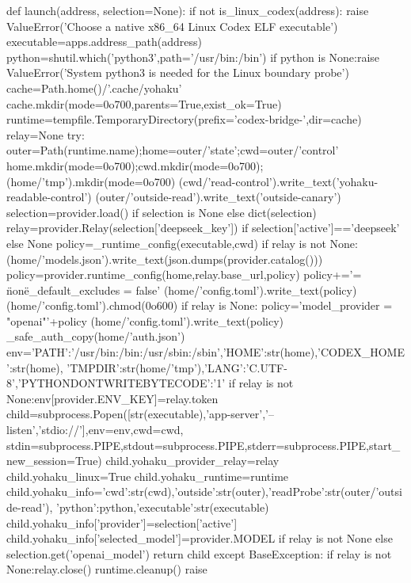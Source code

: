 def launch(address, selection=None):
    if not is_linux_codex(address):
        raise ValueError('Choose a native x86_64 Linux Codex ELF executable')
    executable=apps.address_path(address)
    python=shutil.which('python3',path='/usr/bin:/bin')
    if python is None:raise ValueError('System python3 is needed for the Linux boundary probe')
    cache=Path.home()/'.cache/yohaku'
    cache.mkdir(mode=0o700,parents=True,exist_ok=True)
    runtime=tempfile.TemporaryDirectory(prefix='codex-bridge-',dir=cache)
    relay=None
    try:
        outer=Path(runtime.name);home=outer/'state';cwd=outer/'control'
        home.mkdir(mode=0o700);cwd.mkdir(mode=0o700);(home/'tmp').mkdir(mode=0o700)
        (cwd/'read-control').write_text('yohaku-readable-control')
        (outer/'outside-read').write_text('outside-canary')
        selection=provider.load() if selection is None else dict(selection)
        relay=provider.Relay(selection['deepseek_key']) if selection['active']=='deepseek' else None
        policy=_runtime_config(executable,cwd)
        if relay is not None:
            (home/'models.json').write_text(json.dumps(provider.catalog()))
            policy=provider.runtime_config(home,relay.base_url,policy)
        policy+='\ninherit = \"none\"\nignore_default_excludes = false\n'
        (home/'config.toml').write_text(policy)
        (home/'config.toml').chmod(0o600)
        if relay is None:
            policy='model_provider = "openai"\n'+policy
            (home/'config.toml').write_text(policy)
            _safe_auth_copy(home/'auth.json')
        env={'PATH':'/usr/bin:/bin:/usr/sbin:/sbin','HOME':str(home),'CODEX_HOME':str(home),
             'TMPDIR':str(home/'tmp'),'LANG':'C.UTF-8','PYTHONDONTWRITEBYTECODE':'1'}
        if relay is not None:env[provider.ENV_KEY]=relay.token
        child=subprocess.Popen([str(executable),'app-server','--listen','stdio://'],env=env,cwd=cwd,
                               stdin=subprocess.PIPE,stdout=subprocess.PIPE,stderr=subprocess.PIPE,start_new_session=True)
        child.yohaku_provider_relay=relay
        child.yohaku_linux=True
        child.yohaku_runtime=runtime
        child.yohaku_info={'cwd':str(cwd),'outside':str(outer),'readProbe':str(outer/'outside-read'),
                           'python':python,'executable':str(executable)}
        child.yohaku_info['provider']=selection['active']
        child.yohaku_info['selected_model']=provider.MODEL if relay is not None else selection.get('openai_model')
        return child
    except BaseException:
        if relay is not None:relay.close()
        runtime.cleanup()
        raise


